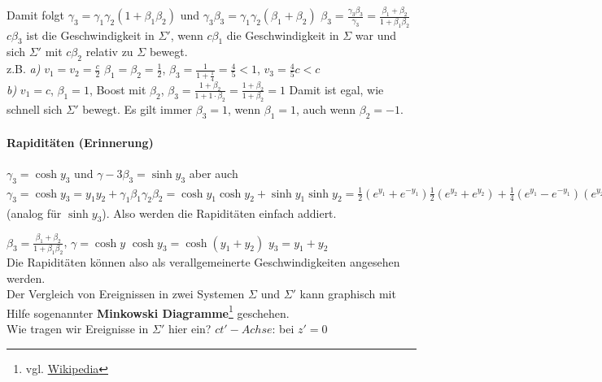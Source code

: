 Damit folgt $\gamma_3 = \gamma_1 \gamma_2 (1 + \beta_1 \beta_2)$ und $\gamma_3 \beta_3 = \gamma_1 \gamma_2 (\beta_1 + \beta_2)$ \conseq $\beta_3 = \frac{\gamma_3 \beta_3}{\gamma_3} = \frac{\beta_1 + \beta_2}{1 + \beta_1 \beta_2}$\\
$c \beta_3$ ist die Geschwindigkeit in $\Sigma'$, wenn $c\beta_1$ die Geschwindigkeit in $\Sigma$ war und sich $\Sigma'$ mit $c\beta_2$ relativ zu $\Sigma$ bewegt.
~\\
z.B. \textit{a)} $v_1 = v_2 = \frac{c}{2}$ \conseq $\beta_1 = \beta_2 = \frac12$, $\beta_3 = \frac{1}{1 + \frac14} = \frac45 < 1$, $v_3 = \frac45 c < c$\\
\textit{b)} $v_1 = c$, $\beta_1 = 1$, Boost mit $\beta_2$, $\beta_3 = \frac{1 + \beta_2}{1 + 1 \cdot \beta_2} = \frac{1 + \beta_2}{1 + \beta_2} = 1$ Damit ist egal, wie schnell sich $\Sigma'$ bewegt. Es gilt immer $\beta_3 = 1$, wenn $\beta_1 = 1$, auch wenn $\beta_2 = -1$.

\paragraph{Rapiditäten (Erinnerung)} \label{Rapiditaeten Erinnerung} $\gamma_3 = \cosh y_3$ und $\gamma-3 \beta_3 = \sinh y_3$
aber auch $\gamma_3 = \cosh y_3 = y_1 y_2 + \gamma_1 \beta_1 \gamma_2 \beta_2 = \cosh y_1 \cosh y_2 + \sinh y_1 \sinh y_2 = \frac12 (e^{y_1} + e^{-y_1}) \frac12 (e^{y_2} + e^{y_2}) + \frac14 (e^{y_1} - e^{- y_1}) (e^{y_2} - e^{-y_2}) = \frac14 (e^{y_1} e^{y_2} + e^{y_1} e^{-y_2} + e^{-y_1} e^{y_2} + e^{-y_1} e^{-y_2} + e^{y_1} e^{y_2} - e^{y_1} e^{-y_2} - e^{-y_1} e^{y_2} - e^{-y_1} e^{-y_2}) = \frac14 (2 e^{y_1} e^{y_2} + 2 e^{-y_1} e^{-y_2}) = \frac12 (e^{y_1 + y_2} + e^{-(y_1 + y_2)}) = \cosh (y_1 + y_2) = \cosh y_3$ (analog für $\sinh y_3$). Also werden die Rapiditäten einfach addiert.


$\beta_3 = \frac{\beta_1 + \beta_2}{1 + \beta_1 \beta_2}$, $\gamma = \cosh y$ \conseq $\cosh y_3 = \cosh(y_1 + y_2)$ \conseq $y_3 = y_1 + y_2$\\
Die Rapiditäten können also als verallgemeinerte Geschwindigkeiten angesehen werden.\\
Der Vergleich von Ereignissen in zwei Systemen $\Sigma$ und $\Sigma'$ kann graphisch mit Hilfe sogenannter \textbf{Minkowski Diagramme}\footnote{vgl. \href{https://de.wikipedia.org/wiki/Minkowski-Diagramm}{Wikipedia}} geschehen.\\
Wie tragen wir Ereignisse in $\Sigma'$ hier ein?
$ct'-Achse$: bei $z' = 0$\\

